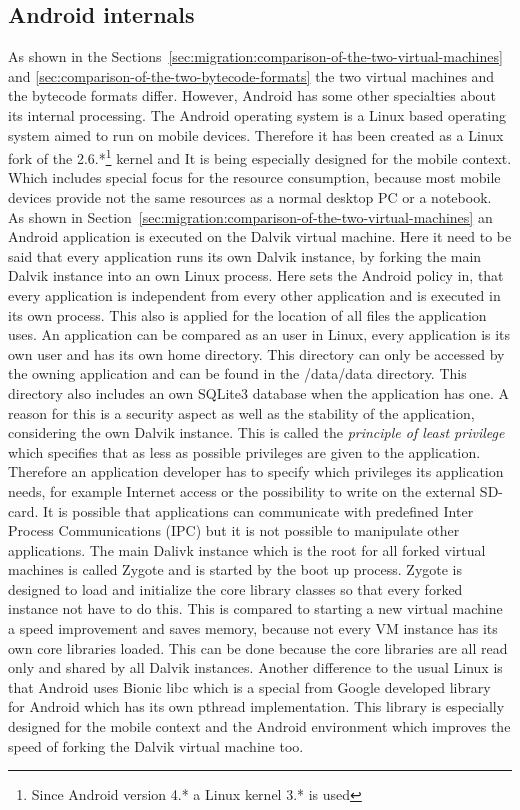 \subsection{Android internals}
\label{sec:android-internals}
As shown in the Sections~\ref{sec:migration:comparison-of-the-two-virtual-machines} and \ref{sec:comparison-of-the-two-bytecode-formats} the two virtual machines and the bytecode formats differ.
However, Android has some other specialties about its internal processing.
The Android operating system is a Linux based operating system aimed to run on mobile devices.
Therefore it has been created as a Linux fork of the 2.6.*\footnote{Since Android version 4.* a Linux kernel 3.* is used} kernel and 
It is being especially designed for the mobile context.
Which includes special focus for the resource consumption, because most mobile devices provide not the same resources as a normal desktop PC or a notebook.
As shown in Section~\ref{sec:migration:comparison-of-the-two-virtual-machines} an Android application is executed on the Dalvik virtual machine.
Here it need to be said that every application runs its own Dalvik instance, by forking the main Dalvik instance into an own Linux process.
Here sets the Android policy in, that every application is independent from every other application and is executed in its own process.
This also is applied for the location of all files the application uses.
An application can be compared as an user in Linux, every application is its own user and has its own home directory.
This directory can only be accessed by the owning application and can be found in the /data/data directory.
This directory also includes an own SQLite3 database when the application has one.
A reason for this is a security aspect as well as the stability of the application, considering the own Dalvik instance.
This is called the \textit{principle of least privilege} which specifies that as less as possible privileges are given to the application.
Therefore an application developer has to specify which privileges its application needs, for example Internet access or the possibility to write on the external SD-card.
It is possible that applications can communicate with predefined Inter Process Communications (IPC) but it is not possible to manipulate other applications.
The main Dalivk instance which is the root for all forked virtual machines is called Zygote and is started by the boot up process.
Zygote is designed to load and initialize the core library classes so that every forked instance not have to do this.
This is compared to starting a new virtual machine a speed improvement and saves memory, because not every VM instance has its own core libraries loaded.
This can be done because the core libraries are all read only and shared by all Dalvik instances.\cite{ehringer2010dalvik}
Another difference to the usual Linux is that Android uses Bionic libc which is a special from Google developed library for Android which has its own pthread implementation.
This library is especially designed for the mobile context and the Android environment which improves the speed of forking the Dalvik virtual machine too.~\cite{brady2008android}



